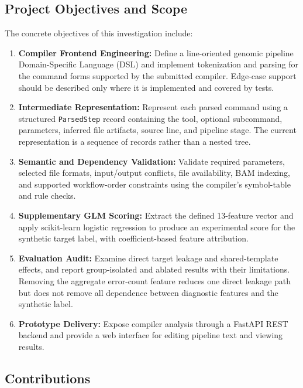 \documentclass[12pt,a4paper]{article}
\begin{document}
\subsection{Project Objectives and Scope}

The concrete objectives of this investigation include:
\begin{enumerate}
    \item \textbf{Compiler Frontend Engineering:} Define a line-oriented genomic pipeline Domain-Specific Language (DSL) and implement tokenization and parsing for the command forms supported by the submitted compiler. Edge-case support should be described only where it is implemented and covered by tests.
    \item \textbf{Intermediate Representation:} Represent each parsed command using a structured \texttt{ParsedStep} record containing the tool, optional subcommand, parameters, inferred file artifacts, source line, and pipeline stage. The current representation is a sequence of records rather than a nested tree.
    \item \textbf{Semantic and Dependency Validation:} Validate required parameters, selected file formats, input/output conflicts, file availability, BAM indexing, and supported workflow-order constraints using the compiler's symbol-table and rule checks.
    \item \textbf{Supplementary GLM Scoring:} Extract the defined 13-feature vector and apply scikit-learn logistic regression to produce an experimental score for the synthetic target label, with coefficient-based feature attribution.
    \item \textbf{Evaluation Audit:} Examine direct target leakage and shared-template effects, and report group-isolated and ablated results with their limitations. Removing the aggregate error-count feature reduces one direct leakage path but does not remove all dependence between diagnostic features and the synthetic label.
    \item \textbf{Prototype Delivery:} Expose compiler analysis through a FastAPI REST backend and provide a web interface for editing pipeline text and viewing results.
\end{enumerate}

\subsection{Contributions}
\end{document}
